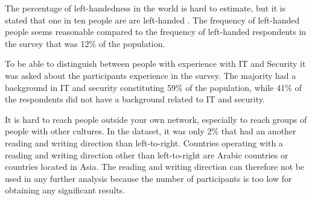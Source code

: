   The percentage of left-handedness in the world is hard to estimate, but it is stated that one in ten people are are left-handed \cite{lefthandedness}. The frequency of left-handed people seems reasonable compared to the frequency of left-handed respondents in the survey that was 12\% of the population. 

  To be able to distinguish between people with experience with IT and Security it was asked about the participants experience in the survey. The majority had a background in IT and security constituting 59\% of the population, while 41\% of the respondents did not have a background related to IT and security. 

  It is hard to reach people outside your own network, especially to reach groups of people with other cultures. In the dataset, it was only 2\% that had an another reading and writing direction than left-to-right. Countries operating with a reading and writing direction other than left-to-right are Arabic countries or countries located in Asia. The reading and writing direction can therefore not be used in any further analysis because the number of participants is too low for obtaining any significant results.

    \begin{figure}[H]
      \centering
      \hspace{0.5cm}
    \end{figure}
    
